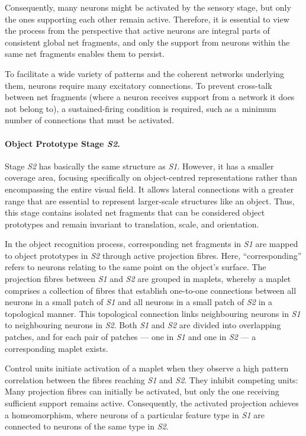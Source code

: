 Consequently, many neurons might be activated by the sensory stage, but only the ones supporting each other remain active.
Therefore, it is essential to view the process from the perspective that active neurons are integral parts of consistent global net fragments, and only the support from neurons within the same net fragments enables them to persist.

To facilitate a wide variety of patterns and the coherent networks underlying them, neurons require many excitatory connections. To prevent cross-talk between net fragments (where a neuron receives support from a network it does not belong to), a sustained-firing condition is required, such as a minimum number of connections that must be activated.

\paragraph{Object Prototype Stage \emph{S2}.} Stage \emph{S2} has basically the same structure as \emph{S1}. However, it has a smaller coverage area, focusing specifically on object-centred representations rather than encompassing the entire visual field. It allows lateral connections with a greater range that are essential to represent larger-scale structures like an object. 
Thus, this stage contains isolated net fragments that can be considered object prototypes and remain invariant to translation, scale, and orientation.

In the object recognition process, corresponding net fragments in \emph{S1} are mapped to object prototypes in \emph{S2} through active projection fibres. Here, ``corresponding'' refers to neurons relating to the same point on the object's surface.
The projection fibres between \emph{S1} and \emph{S2} are grouped in maplets, whereby a maplet comprises a collection of fibres that establish one-to-one connections between all neurons in a small patch of \emph{S1} and all neurons in a small patch of \emph{S2} in a topological manner. This topological connection links neighbouring neurons in \emph{S1} to neighbouring neurons in \emph{S2}. Both \emph{S1} and \emph{S2} are divided into overlapping patches, and for each pair of patches — one in \emph{S1} and one in \emph{S2} — a corresponding maplet exists.

Control units initiate activation of a maplet when they observe a high pattern correlation between the fibres reaching \emph{S1} and \emph{S2}. They inhibit competing units: Many projection fibres can initially be activated, but only the one receiving sufficient support remains active.
Consequently, the activated projection achieves a homeomorphism, where neurons of a particular feature type in \emph{S1} are connected to neurons of the same type in \emph{S2}.

